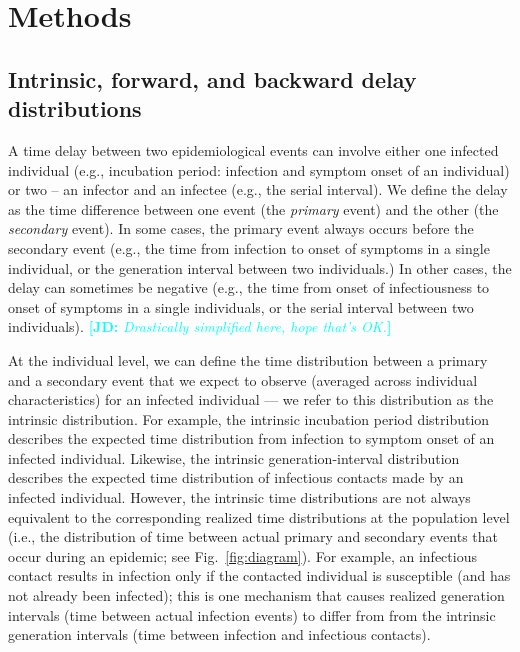 \documentclass[12pt]{article}
\newcommand{\comment}{\showcomment}
\newcommand{\showcomment}[3]{\textcolor{#1}{\textbf{[#2: }\textsl{#3}\textbf{]}}}
\newcommand{\jd}[1]{\comment{cyan}{JD}{#1}}
\newcommand{\fref}[1]{Fig.~\ref{fig:#1}}
\begin{document}
\section{Methods}

\subsection{Intrinsic, forward, and backward delay distributions}

A time delay between two epidemiological events can involve either one infected individual (e.g., incubation period: infection and symptom onset of an individual) or two -- an infector and an infectee (e.g., the serial interval).
We define the delay as the time difference between one event (the \emph{primary} event) and the other (the \emph{secondary} event).
In some cases, the primary event always occurs before the secondary event (e.g., the time from infection to onset of symptoms in a single individual, or the generation interval between two individuals.) 
In other cases, the delay can sometimes be negative (e.g., the time from onset of infectiousness to onset of symptoms in a single individuals, or the serial interval between two individuals).
\jd{Drastically simplified here, hope that's OK.}

At the individual level, we can define the time distribution between a primary and a secondary event that we expect to observe (averaged across individual characteristics) for an infected individual --- we refer to this distribution as the intrinsic distribution.
For example, the intrinsic incubation period distribution describes the expected time distribution from infection to symptom onset of an infected individual.
Likewise, the intrinsic generation-interval distribution describes the expected time distribution of infectious contacts made by an infected individual.
However, the intrinsic time distributions are not always equivalent to the corresponding realized time distributions at the population level (i.e., the distribution of time between actual primary and secondary events that occur during an epidemic; see \fref{diagram}).
For example, an infectious contact results in infection only if the contacted individual is susceptible (and has not already been infected);
this is one mechanism that causes realized generation intervals (time between actual infection events) to differ from from the intrinsic generation intervals (time between infection and infectious contacts).
\end{document}
